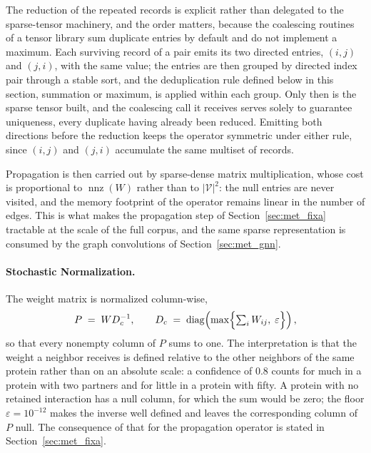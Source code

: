 \documentclass[Ingles]{ic-tese-v3}
\begin{document}
The reduction of the repeated records is explicit rather than delegated to the sparse-tensor
machinery, and the order matters, because the coalescing routines of a tensor library sum duplicate
entries by default and do not implement a maximum. Each surviving record of a pair emits its two
directed entries, $(i,j)$ and $(j,i)$, with the same value; the entries are then grouped by directed
index pair through a stable sort, and the deduplication rule defined below in this section, summation or maximum,
is applied within each group. Only then is the sparse tensor built, and the coalescing call it
receives serves solely to guarantee uniqueness, every duplicate having already been reduced.
Emitting both directions before the reduction keeps the operator symmetric under either rule, since
$(i,j)$ and $(j,i)$ accumulate the same multiset of records.

Propagation is then carried out by sparse-dense matrix multiplication, whose cost is proportional to
$\operatorname{nnz}(W)$ rather than to $|\mathcal{V}|^2$: the null entries are never visited, and
the
memory footprint of the operator remains linear in the number of edges. This is what makes the
propagation step of
Section~\ref{sec:met_fixa} tractable at the scale of the full corpus, and the same sparse
representation is consumed by the graph convolutions of Section~\ref{sec:met_gnn}.

\paragraph{Stochastic Normalization.} The weight matrix is normalized column-wise,
\begin{equation}
  P \;=\; W D_c^{-1},
  \qquad
  D_c \;=\; \operatorname{diag}\!\left(\max\Bigl\{\textstyle\sum_i W_{ij},\; \varepsilon\Bigr\}\right),
  \label{eq:met_P}
\end{equation}
\noindent so that every nonempty column of $P$ sums to one. The interpretation is that the weight a neighbor
receives is defined relative to the other neighbors of the same protein rather than on an
absolute scale: a confidence of $0.8$ counts for much in a protein with two partners and for little
in a protein with fifty. A protein with no retained interaction has a null column, for which the
sum would be zero; the floor $\varepsilon = 10^{-12}$ makes the inverse well defined and leaves the
corresponding column of $P$ null. The consequence of that for the propagation operator is stated in
Section~\ref{sec:met_fixa}.
\end{document}
